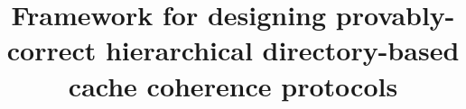 \title{
Framework for designing provably-correct hierarchical directory-based cache coherence protocols
}
